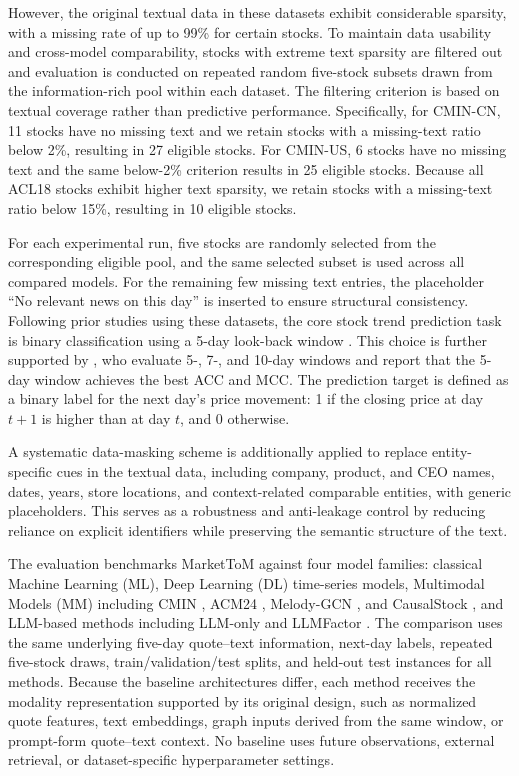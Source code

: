 \documentclass[a4paper,fleqn,doubleblind]{cas-sc}
\newcommand{\revise}[1]{{\color{blue}#1}}
\begin{document}
However, the original textual data in these datasets exhibit considerable sparsity, with a missing rate of up to 99\% for certain stocks. To maintain data usability and cross-model comparability, stocks with extreme text sparsity are filtered out and evaluation is conducted on repeated random five-stock subsets drawn from the information-rich pool within each dataset. The filtering criterion is based on textual coverage rather than predictive performance. Specifically, for CMIN-CN, 11 stocks have no missing text and we retain stocks with a missing-text ratio below 2\%, resulting in 27 eligible stocks. For CMIN-US, 6 stocks have no missing text and the same below-2\% criterion results in 25 eligible stocks. Because all ACL18 stocks exhibit higher text sparsity, we retain stocks with a missing-text ratio below 15\%, resulting in 10 eligible stocks.

For each experimental run, five stocks are randomly selected from the corresponding eligible pool, and the same selected subset is used across all compared models. For the remaining few missing text entries, the placeholder ``No relevant news on this day'' is inserted to ensure structural consistency. Following prior studies using these datasets, the core stock trend prediction task is binary classification using a 5-day look-back window \citep{xu2022self, luo2023causality, zhang2024incorporating}. \revise{This choice is further supported by \citet{zhang2024incorporating}, who evaluate 5-, 7-, and 10-day windows and report that the 5-day window achieves the best ACC and MCC.} The prediction target is defined as a binary label for the next day's price movement: 1 if the closing price at day $t+1$ is higher than at day $t$, and 0 otherwise.

A systematic data-masking scheme is additionally applied to replace entity-specific cues in the textual data, including company, product, and CEO names, dates, years, store locations, and context-related comparable entities, with generic placeholders. This serves as a robustness and anti-leakage control by reducing reliance on explicit identifiers while preserving the semantic structure of the text.

The evaluation benchmarks MarketToM against four model families: classical Machine Learning (ML), Deep Learning (DL) time-series models, Multimodal Models (MM) including CMIN \citep{luo2023causality}, ACM24 \citep{du2024explainable}, Melody-GCN \citep{liu2024multimodal}, and CausalStock \citep{li2024causalstock}, and LLM-based methods including LLM-only and LLMFactor \citep{wang2024llmfactor}. \revise{The comparison uses the same underlying five-day quote--text information, next-day labels, repeated five-stock draws, train/validation/test splits, and held-out test instances for all methods. Because the baseline architectures differ, each method receives the modality representation supported by its original design, such as normalized quote features, text embeddings, graph inputs derived from the same window, or prompt-form quote--text context. No baseline uses future observations, external retrieval, or dataset-specific hyperparameter settings.}
\end{document}
